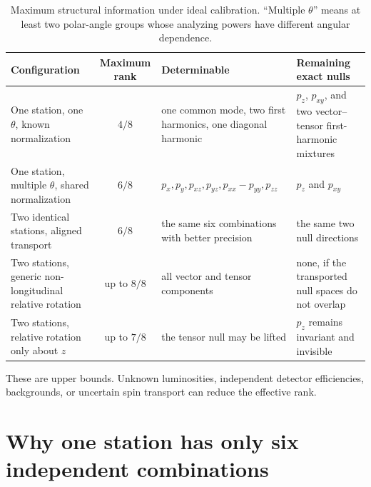 \documentclass[11pt,a4paper]{article}
\begin{document}
\begin{table}[htbp]
\centering
\caption{Maximum structural information under ideal calibration.  ``Multiple
$\theta$'' means at least two polar-angle groups whose analyzing powers have
different angular dependence.}
\small
\begin{tabularx}{\linewidth}{YcYY}
\toprule
Configuration & Maximum rank & Determinable & Remaining exact nulls\\
\midrule
One station, one $\theta$, known normalization
& $4/8$ & one common mode, two first harmonics, one diagonal harmonic
& $p_z$, $p_{xy}$, and two vector--tensor first-harmonic mixtures\\
One station, multiple $\theta$, shared normalization
& $6/8$ & $p_x,p_y,p_{xz},p_{yz},p_{xx}-p_{yy},p_{zz}$
& $p_z$ and $p_{xy}$\\
Two identical stations, aligned transport
& $6/8$ & the same six combinations with better precision
& the same two null directions\\
Two stations, generic non-longitudinal relative rotation
& up to $8/8$ & all vector and tensor components
& none, if the transported null spaces do not overlap\\
Two stations, relative rotation only about $z$
& up to $7/8$ & the tensor null may be lifted
& $p_z$ remains invariant and invisible\\
\bottomrule
\end{tabularx}
\end{table}

These are upper bounds.  Unknown luminosities, independent detector efficiencies,
backgrounds, or uncertain spin transport can reduce the effective rank.

\section{Why one station has only six independent combinations}
\end{document}
